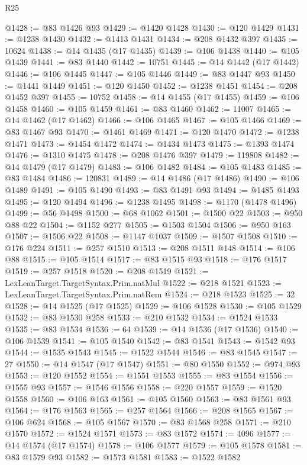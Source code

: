 \begin{lexlean}{R25}
\begin{coremodule}
@1428 := @83 @1426 @93
@1429 := @1420 @1428
@1430 := @120 @1429
@1431 := @1238 @1430
@1432 := @1413 @1431
@1434 := @208 @1432 @397
@1435 := 10624
@1438 := @14 @1435 (@17 @1435)
@1439 := @106 @1438
@1440 := @105 @1439
@1441 := @83 @1440
@1442 := 10751
@1445 := @14 @1442 (@17 @1442)
@1446 := @106 @1445
@1447 := @105 @1446
@1449 := @83 @1447 @93
@1450 := @1441 @1449
@1451 := @120 @1450
@1452 := @1238 @1451
@1454 := @208 @1452 @397
@1455 := 10752
@1458 := @14 @1455 (@17 @1455)
@1459 := @106 @1458
@1460 := @105 @1459
@1461 := @83 @1460
@1462 := 11007
@1465 := @14 @1462 (@17 @1462)
@1466 := @106 @1465
@1467 := @105 @1466
@1469 := @83 @1467 @93
@1470 := @1461 @1469
@1471 := @120 @1470
@1472 := @1238 @1471
@1473 := @1454 @1472
@1474 := @1434 @1473
@1475 := @1393 @1474
@1476 := @1310 @1475
@1478 := @208 @1476 @397
@1479 := 119808
@1482 := @14 @1479 (@17 @1479)
@1483 := @106 @1482
@1484 := @105 @1483
@1485 := @83 @1484
@1486 := 120831
@1489 := @14 @1486 (@17 @1486)
@1490 := @106 @1489
@1491 := @105 @1490
@1493 := @83 @1491 @93
@1494 := @1485 @1493
@1495 := @120 @1494
@1496 := @1238 @1495
@1498 := @1170 (@1478 @1496)
@1499 := @56 @1498
@1500 := @68 @1062
@1501 := @1500 @22
@1503 := @950 @88 @22
@1504 := @1152 @277
@1505 := @1503 @1504
@1506 := @950 @163
@1507 := @1506 @22
@1508 := @1147 @1037
@1509 := @1507 @1508
@1510 := @176 @224
@1511 := @257 @1510
@1513 := @208 @1511 @148
@1514 := @106 @88
@1515 := @105 @1514
@1517 := @83 @1515 @93
@1518 := @176 @1517
@1519 := @257 @1518
@1520 := @208 @1519
@1521 := LexLeanTarget.TargetSyntax.Prim.natMul
@1522 := @218 @1521
@1523 := LexLeanTarget.TargetSyntax.Prim.natRem
@1524 := @218 @1523
@1525 := 32
@1528 := @14 @1525 (@17 @1525)
@1529 := @106 @1528
@1530 := @105 @1529
@1532 := @83 @1530 @258
@1533 := @210 @1532
@1534 := @1524 @1533
@1535 := @83 @1534
@1536 := 64
@1539 := @14 @1536 (@17 @1536)
@1540 := @106 @1539
@1541 := @105 @1540
@1542 := @83 @1541
@1543 := @1542 @93
@1544 := @1535 @1543
@1545 := @1522 @1544
@1546 := @83 @1545
@1547 := 27
@1550 := @14 @1547 (@17 @1547)
@1551 := @80 @1550
@1552 := @974 @93
@1553 := @120 @1552
@1554 := @1551 @1553
@1555 := @83 @1554
@1556 := @1555 @93
@1557 := @1546 @1556
@1558 := @220 @1557
@1559 := @1520 @1558
@1560 := @106 @163
@1561 := @105 @1560
@1563 := @83 @1561 @93
@1564 := @176 @1563
@1565 := @257 @1564
@1566 := @208 @1565
@1567 := @106 @624
@1568 := @105 @1567
@1570 := @83 @1568 @258
@1571 := @210 @1570
@1572 := @1524 @1571
@1573 := @83 @1572
@1574 := 4096
@1577 := @14 @1574 (@17 @1574)
@1578 := @106 @1577
@1579 := @105 @1578
@1581 := @83 @1579 @93
@1582 := @1573 @1581
@1583 := @1522 @1582

\end{coremodule}
\end{lexlean}
